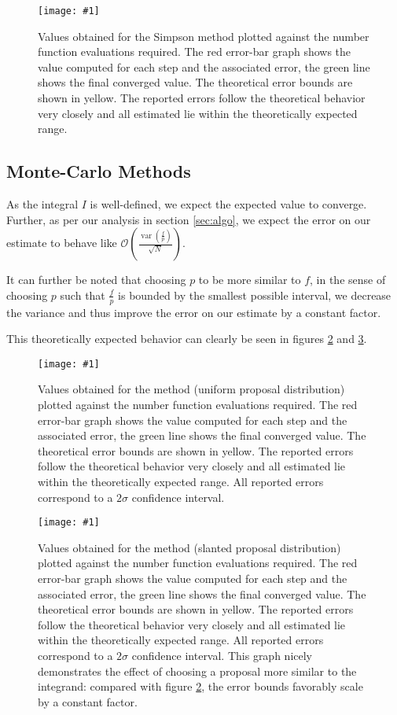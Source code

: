 \documentclass[10pt, a4paper]{article}
\newcommand{\plot}[3]{\begin{figure}[ht]\centering\texttt{[image: \#1]}\caption{#2}\label{#3}\end{figure}}
\begin{document}
  \plot{proj-simp-accuracy}{
    Values obtained for the Simpson method plotted against the number function evaluations required. The red
    error-bar graph shows the value computed for each step and the associated error, the green line
    shows the final converged value. The theoretical error bounds are shown in yellow. The reported errors
    follow the theoretical behavior very closely and all estimated lie within the theoretically expected range.
  }{fig:simp}

  \subsection{Monte-Carlo Methods}
  As the integral $I$ is well-defined, we expect the expected value to converge. Further, as per our
  analysis in section \ref{sec:algo}, we expect the error on our estimate to behave like
  $\mathcal{O}\left( \frac{\operatorname{var}(\frac fp)}{\sqrt N} \right)$.

  It can further be noted that choosing $p$ to be more similar to $f$, in the sense of choosing $p$
  such that $\frac fp$ is bounded by the smallest possible interval, we decrease the variance and thus
  improve the error on our estimate by a constant factor.

  This theoretically expected behavior can clearly be seen in figures \ref{fig:mont-flat} and
  \ref{fig:mont-slant}.

  \plot{proj-mont-flat-accuracy}{
    Values obtained for the \is{} method (uniform proposal distribution) plotted against the number
    function evaluations required. The red
    error-bar graph shows the value computed for each step and the associated error, the green line
    shows the final converged value. The theoretical error bounds are shown in yellow. The reported errors
    follow the theoretical behavior very closely and all estimated lie within the theoretically expected range.
    All reported errors correspond to a $2\sigma$ confidence interval.
  }{fig:mont-flat}

  \plot{proj-mont-slanted-accuracy}{
    Values obtained for the \is{} method (slanted proposal distribution) plotted against the number
    function evaluations required. The red
    error-bar graph shows the value computed for each step and the associated error, the green line
    shows the final converged value. The theoretical error bounds are shown in yellow. The reported errors
    follow the theoretical behavior very closely and all estimated lie within the theoretically expected range.
    All reported errors correspond to a $2\sigma$ confidence interval. This graph nicely demonstrates the
    effect of choosing a proposal more similar to the integrand: compared with figure \ref{fig:mont-flat},
    the error bounds favorably scale by a constant factor.
  }{fig:mont-slant}
\end{document}
